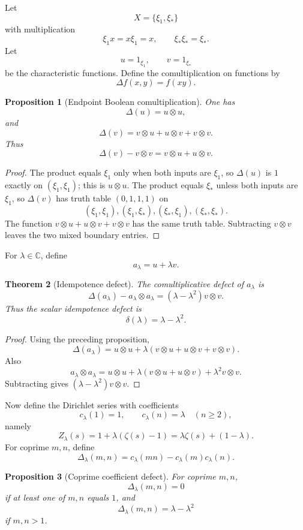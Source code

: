 \documentclass[11pt]{amsart}
\newtheorem{theorem}{Theorem}[section]
\newtheorem{proposition}[theorem]{Proposition}
\newcommand{\CC}{\mathbb C}
\begin{document}
Let
\[
       X=\{\xi_1,\xi_*\}
\]
with multiplication
\[
       \xi_1x=x\xi_1=x,
       \qquad
       \xi_*\xi_* = \xi_*.
\]
Let
\[
       u=1_{\xi_1},
       \qquad
       v=1_{\xi_*}
\]
be the characteristic functions.  Define the comultiplication on functions by
\[
       \Delta f(x,y)=f(xy).
\]

\begin{proposition}[Endpoint Boolean comultiplication]
One has
\[
       \Delta(u)=u\otimes u,
\]
and
\[
       \Delta(v)=v\otimes u+u\otimes v+v\otimes v.
\]
Thus
\[
       \Delta(v)-v\otimes v=v\otimes u+u\otimes v.
\]
\end{proposition}

\begin{proof}
The product equals $\xi_1$ only when both inputs are $\xi_1$, so $\Delta(u)$ is $1$ exactly on $(\xi_1,\xi_1)$; this is $u\otimes u$.  The product equals $\xi_*$ unless both inputs are $\xi_1$, so $\Delta(v)$ has truth table $(0,1,1,1)$ on
\[
       (\xi_1,\xi_1), (\xi_1,\xi_*), (\xi_*,\xi_1), (\xi_*,\xi_*).
\]
The function $v\otimes u+u\otimes v+v\otimes v$ has the same truth table.  Subtracting $v\otimes v$ leaves the two mixed boundary entries.\end{proof}

For $\lambda\in\CC$, define
\[
       a_\lambda=u+\lambda v.
\]

\begin{theorem}[Idempotence defect]
The comultiplicative defect of $a_\lambda$ is
\[
       \Delta(a_\lambda)-a_\lambda\otimes a_\lambda
       = (\lambda-\lambda^2)v\otimes v.
\]
Thus the scalar idempotence defect is
\[
       \delta(\lambda)=\lambda-\lambda^2.
\]
\end{theorem}

\begin{proof}
Using the preceding proposition,
\[
       \Delta(a_\lambda)=u\otimes u+\lambda(v\otimes u+u\otimes v+v\otimes v).
\]
Also
\[
       a_\lambda\otimes a_\lambda
       =u\otimes u+\lambda(v\otimes u+u\otimes v)+\lambda^2v\otimes v.
\]
Subtracting gives $(\lambda-\lambda^2)v\otimes v$.\end{proof}

Now define the Dirichlet series with coefficients
\[
       c_\lambda(1)=1,
       \qquad
       c_\lambda(n)=\lambda\quad(n\ge2),
\]
namely
\[
       Z_\lambda(s)=1+\lambda(\zeta(s)-1)=\lambda\zeta(s)+(1-\lambda).
\]
For coprime $m,n$, define
\[
       \Delta_\lambda(m,n)=c_\lambda(mn)-c_\lambda(m)c_\lambda(n).
\]

\begin{proposition}[Coprime coefficient defect]
For coprime $m,n$,
\[
       \Delta_\lambda(m,n)=0
\]
if at least one of $m,n$ equals $1$, and
\[
       \Delta_\lambda(m,n)=\lambda-\lambda^2
\]
if $m,n>1$.
\end{proposition}
\end{document}

